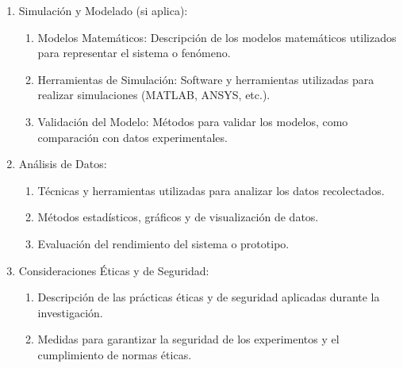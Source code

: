 \begin{enumerate}
\begin{enumerate}
    \end{enumerate}
    \item Simulación y Modelado (si aplica):
    \begin{enumerate}
        \item Modelos Matemáticos: Descripción de los modelos matemáticos utilizados para representar el sistema o fenómeno.
        \item Herramientas de Simulación: Software y herramientas utilizadas para realizar simulaciones (MATLAB, ANSYS, etc.).
        \item Validación del Modelo: Métodos para validar los modelos, como comparación con datos experimentales.
    \end{enumerate}
    \item Análisis de Datos:
    \begin{enumerate}
        \item Técnicas y herramientas utilizadas para analizar los datos recolectados.
        \item Métodos estadísticos, gráficos y de visualización de datos.
        \item Evaluación del rendimiento del sistema o prototipo.
    \end{enumerate}
    \item Consideraciones Éticas y de Seguridad:
    \begin{enumerate}
        \item Descripción de las prácticas éticas y de seguridad aplicadas durante la investigación.
        \item Medidas para garantizar la seguridad de los experimentos y el cumplimiento de normas éticas.
    \end{enumerate}
\end{enumerate}

        

    
        
        

    
    
        

    
        
        

    








  





